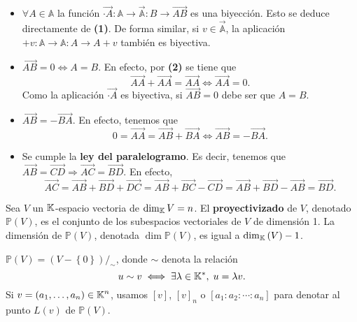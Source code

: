 \begin{observation}
	\begin{itemize}
	\item $\displaystyle \forall A \in \mathbb{A} $ la función $\displaystyle \overrightarrow{ \cdot A} : \mathbb{A} \to \vec{\mathbb{A}} : B \to \overrightarrow{AB} $ es una biyección. Esto se deduce directamente de \textbf{(1)}. De forma similar, si $\displaystyle v \in \vec{\mathbb{A}} $, la aplicación $\displaystyle + v : \mathbb{A} \to \mathbb{A}: A \to A + v $ también es biyectiva.
	\item $\displaystyle \overrightarrow{AB} = 0 \iff A = B $. En efecto, por \textbf{(2)} se tiene que 
		\[\overrightarrow{A A} + \overrightarrow{ A A} = \overrightarrow{A A} \iff \overrightarrow{A A } = 0 .\]
		Como la aplicación $\displaystyle \overrightarrow{ \cdot A} $ es biyectiva, si $\displaystyle \overrightarrow{AB} = 0 $ debe ser que $\displaystyle A = B $. 
	\item $\displaystyle \overrightarrow{AB} = - \overrightarrow{BA} $. En efecto, tenemos que
		\[0 = \overrightarrow{A A} = \overrightarrow{AB} + \overrightarrow{BA} \iff \overrightarrow{AB} = - \overrightarrow{BA} .\]
	\item Se cumple la \textbf{ley del paralelogramo}. Es decir, tenemos que $\displaystyle \overrightarrow{AB} = \overrightarrow{CD} \Rightarrow \overrightarrow{AC} = \overrightarrow{BD} $. En efecto,
		\[\overrightarrow{AC} = \overrightarrow{AB} + \overrightarrow{BD} + \overrightarrow{DC} = \overrightarrow{AB} + \overrightarrow{BC}-\overrightarrow{CD} = \overrightarrow{AB} + \overrightarrow{BD} - \overrightarrow{AB} = \overrightarrow{BD} .\]
	\end{itemize} 
\end{observation}
\begin{definition}
Sea $\displaystyle V $ un $\displaystyle \mathbb{K} $-espacio vectoria de $\displaystyle \dim _{\mathbb{K}}V = n $. El \textbf{proyectivizado} de $\displaystyle V $, denotado $\displaystyle \mathbb{P}\left(V\right) $, es el conjunto de los subespacios vectoriales de $\displaystyle V $ de dimensión 1. La dimensión de $\displaystyle \mathbb{P}\left(V\right) $, denotada $\displaystyle \dim \mathbb{P}\left(V\right) $, es igual a $\displaystyle \dim _{\mathbb{K}}\left(V\right) -1 $.
\end{definition}
\begin{observation}
	$\displaystyle \mathbb{P}\left(V\right) = \left(V- \left\{ 0\right\} \right)/_{\sim} $, donde $\displaystyle \sim $ denota la relación
	\[u \sim v \iff \exists \lambda \in \mathbb{K} ^{*}, \; u = \lambda v .\]
	Si $\displaystyle v = \left(a_{1}, \ldots, a_{n}\right) \in \mathbb{K}^{n} $, usamos $\displaystyle [v] $, $\displaystyle [v]_{n} $ o $\displaystyle [a_{1} : a_{2} : \cdots : a_{n}] $ para denotar al punto $\displaystyle L\left(v\right) $ de $\displaystyle \mathbb{P}\left(V\right) $.
\end{observation}
